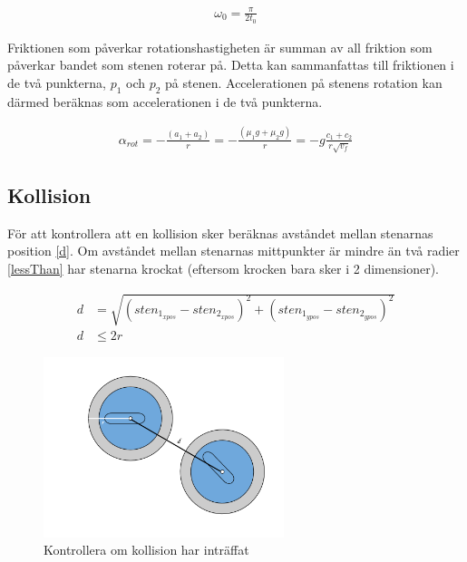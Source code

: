 \documentclass[11pt]{article} %
\begin{document}
\begin{align}\label{vinkelhastighet}
 \omega_0 = \frac{\pi}{2 t_0} 
 \end{align}


Friktionen som påverkar rotationshastigheten är summan av all friktion som påverkar bandet som stenen roterar på. Detta kan sammanfattas till friktionen i de två punkterna, $p_1$ och $p_2$ på stenen. Accelerationen på stenens rotation kan därmed beräknas som accelerationen i de två punkterna. 

 \begin{align}\label{a_rotation1}
 \alpha_{rot} =- \frac{( a_1 + a_2)}{r} = -\frac{(\mu_1 g + \mu_2 g)}{r} = - g\frac{c_1+c_2}{r \sqrt{v_f}}
 \end{align}
 
\pagebreak
\subsection{Kollision}

För att kontrollera att en kollision sker beräknas avståndet mellan stenarnas position \eqref{d}.
Om avståndet mellan stenarnas mittpunkter är mindre än två radier \eqref{lessThan} har stenarna krockat  (eftersom krocken bara sker i 2 dimensioner). 

 \begin{subequations}
 \begin{align}\label{d}
 d& = \sqrt{(sten_{1_{xpos}} - sten_{2_{xpos}})^2   +   (sten_{1_{ypos}}-sten_{2_{ypos}})^2}\\\label{lessThan}
 d& \le 2 r
 \end{align}
 \end{subequations}

\begin{figure}[ht!]
\centering
\includegraphics[width=70mm]{krock.png}
\caption{Kontrollera om kollision har inträffat}
\label{fig:kollision}
\label{overflow}
\end{figure}
\end{document}
